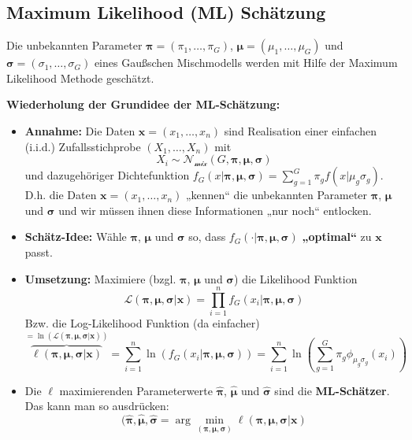 \documentclass[
]{book}
\providecommand{\tightlist}{%
  \setlength{\itemsep}{0pt}\setlength{\parskip}{0pt}}
\begin{document}
\hypertarget{maximum-likelihood-ml-schuxe4tzung}{%
\subsection{Maximum Likelihood (ML) Schätzung}\label{maximum-likelihood-ml-schuxe4tzung}}

Die unbekannten Parameter \(\boldsymbol{\pi}=(\pi_1,\dots,\pi_G)\), \(\boldsymbol{\mu}=(\mu_1,\dots,\mu_G)\) und \(\boldsymbol{\sigma}=(\sigma_1,\dots,\sigma_G)\) eines Gaußschen Mischmodells werden mit Hilfe der Maximum Likelihood Methode geschätzt.

\textbf{Wiederholung der Grundidee der ML-Schätzung:}

\begin{itemize}
\tightlist
\item
  \textbf{Annahme:} Die Daten \(\mathbf{x}=(x_1,\dots,x_n)\) sind Realisation einer einfachen (i.i.d.) Zufallsstichprobe \((X_1,\dots,X_n)\) mit
  \[ 
  X_i\sim\mathcal{N}_{\mathcal{mix}}(G,\boldsymbol{\pi},\boldsymbol{\mu},\boldsymbol{\sigma})
  \]
  und dazugehöriger Dichtefunktion \(f_G(x|\boldsymbol{\pi},\boldsymbol{\mu},\boldsymbol{\sigma})=\sum_{g=1}^G\pi_gf(x|\mu_g\sigma_g)\). D.h. die Daten \(\mathbf{x}=(x_1,\dots,x_n)\) „kennen`` die unbekannten Parameter \(\boldsymbol{\pi}\), \(\boldsymbol{\mu}\) und \(\boldsymbol{\sigma}\) und wir müssen ihnen diese Informationen „nur noch`` entlocken.
\item
  \textbf{Schätz-Idee:} Wähle \(\boldsymbol{\pi}\), \(\boldsymbol{\mu}\) und \(\boldsymbol{\sigma}\) so, dass \(f_G(\cdot|\boldsymbol{\pi},\boldsymbol{\mu},\boldsymbol{\sigma})\) \textbf{„optimal``} zu \(\mathbf{x}\) passt.
\item
  \textbf{Umsetzung:} Maximiere (bzgl. \(\boldsymbol{\pi}\), \(\boldsymbol{\mu}\) und \(\boldsymbol{\sigma}\)) die Likelihood Funktion
  \[\mathcal{L}(\boldsymbol{\pi},\boldsymbol{\mu},\boldsymbol{\sigma}|\mathbf{x})=\prod_{i=1}^nf_G(x_i|\boldsymbol{\pi},\boldsymbol{\mu},\boldsymbol{\sigma})\]
  Bzw. die Log-Likelihood Funktion (da einfacher)
  \[
  \overbrace{\ell(\boldsymbol{\pi},\boldsymbol{\mu},\boldsymbol{\sigma}|\mathbf{x})}^{=\ln\left(\mathcal{L}(\boldsymbol{\pi},\boldsymbol{\mu},\boldsymbol{\sigma}|\mathbf{x})\right)}
  =\sum_{i=1}^n\ln\left(f_G(x_i|\boldsymbol{\pi},\boldsymbol{\mu},\boldsymbol{\sigma})\right)
  =\sum_{i=1}^n\ln\left(\sum_{g=1}^G\pi_g\phi_{\mu_g\sigma_g}(x_i)\right)
  \]
\item
  Die \(\ell\) maximierenden Parameterwerte {\(\hat{\boldsymbol{\pi}}\)}, {\(\hat{\boldsymbol{\mu}}\)} und {\(\hat{\boldsymbol{\sigma}}\)} sind die {\textbf{ML-Schätzer}}. Das kann man so ausdrücken:
  \[
  (\hat{\boldsymbol{\pi}},\hat{\boldsymbol{\mu}},\hat{\boldsymbol{\sigma}}=\arg\min_{(\boldsymbol{\pi},\boldsymbol{\mu},\boldsymbol{\sigma})}\ell(\boldsymbol{\pi},\boldsymbol{\mu},\boldsymbol{\sigma}|\mathbf{x})
  \]
\end{itemize}
\end{document}
